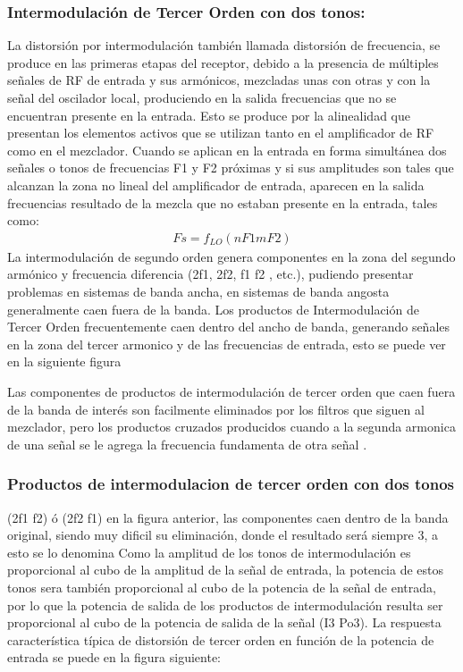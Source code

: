 \documentclass[letterpaper,10pt,spanish]{sphinxmanual}
\begin{document}
\subsubsection{Intermodulación de Tercer Orden con dos tonos:}
\label{\detokenize{introduccion/sistemas:Intermodulaci_xf3n-de-Tercer-Orden-con-dos-tonos:}}
La distorsión por intermodulación también llamada distorsión de frecuencia, se produce en las primeras etapas del receptor, debido a la presencia de múltiples señales de RF de entrada y sus armónicos, mezcladas unas con otras y con la señal del oscilador local, produciendo en la salida frecuencias que no se encuentran presente en la entrada. Esto se produce por la alinealidad que presentan los elementos activos que se utilizan tanto en el amplificador de RF como en el mezclador. Cuando se
aplican en la entrada en forma simultánea dos señales o tonos de frecuencias F1 y F2 próximas y si sus amplitudes son tales que alcanzan la zona no lineal del amplificador de entrada, aparecen en la salida frecuencias resultado de la mezcla que no estaban presente en la entrada, tales como:
\begin{equation*}
\begin{split}Fs  =  f_{LO} ( nF1 mF2)\end{split}
\end{equation*}
La intermodulación de segundo orden genera componentes en la zona del segundo armónico y frecuencia diferencia (2f1, 2f2, f1 f2 , etc.), pudiendo presentar problemas en sistemas de banda ancha, en sistemas de banda angosta generalmente caen fuera de la banda. Los productos de Intermodulación de Tercer Orden frecuentemente caen dentro del ancho de banda, generando señales en la zona del tercer armonico y de las frecuencias de entrada, esto se puede ver en la siguiente figura

Las componentes de productos de intermodulación de tercer orden que caen fuera de la banda de interés son facilmente eliminados por los filtros que siguen al mezclador, pero los productos cruzados producidos cuando a la segunda armonica de una señal se le agrega la frecuencia fundamenta de otra señal .


\subsubsection{Productos de intermodulacion de tercer orden con dos tonos}
\label{\detokenize{introduccion/sistemas:Productos-de-intermodulacion-de-tercer-orden-con-dos-tonos}}
(2f1 \textendash{} f2) ó (2f2 \textendash{} f1) en la figura anterior, las componentes caen dentro de la banda original, siendo muy dificil su eliminación, donde el resultado será siempre 3, a esto se lo denomina Como la amplitud de los tonos de intermodulación es proporcional al cubo de la amplitud de la señal de entrada, la potencia de estos tonos sera también proporcional al cubo de la potencia de la señal de entrada, por lo que la potencia de salida de los productos de intermodulación resulta ser proporcional al
cubo de la potencia de salida de la señal (I3 Po3). La respuesta característica típica de distorsión de tercer orden en función de la potencia de entrada se puede en la figura siguiente:
\end{document}
